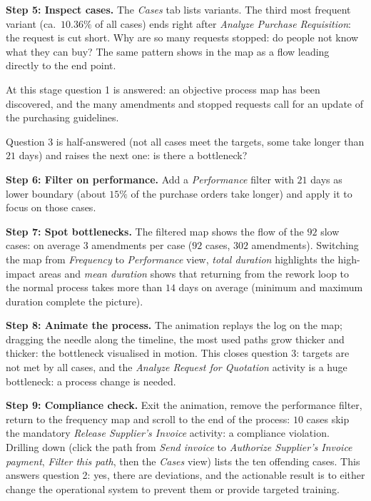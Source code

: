 \textbf{Step 5: Inspect cases.} The \emph{Cases} tab lists variants. The third most frequent variant (ca.\ $10.36\%$ of all cases) ends right after \emph{Analyze Purchase Requisition}: the request is cut short. Why are so many requests stopped: do people not know what they can buy? The same pattern shows in the map as a flow leading directly to the end point.

At this stage question 1 is answered: an objective process map has been discovered, and the many amendments and stopped requests call for an update of the purchasing guidelines.

Question 3 is half-answered (not all cases meet the targets, some take longer than $21$ days) and raises the next one: is there a bottleneck?

\textbf{Step 6: Filter on performance.} Add a \emph{Performance} filter with $21$ days as lower boundary (about $15\%$ of the purchase orders take longer) and apply it to focus on those cases.

\textbf{Step 7: Spot bottlenecks.} The filtered map shows the flow of the $92$ slow cases: on average $3$ amendments per case ($92$ cases, $302$ amendments). Switching the map from \emph{Frequency} to \emph{Performance} view, \emph{total duration} highlights the high-impact areas and \emph{mean duration} shows that returning from the rework loop to the normal process takes more than $14$ days on average (minimum and maximum duration complete the picture).

\textbf{Step 8: Animate the process.} The animation replays the log on the map; dragging the needle along the timeline, the most used paths grow thicker and thicker: the bottleneck visualised in motion. This closes question 3: targets are not met by all cases, and the \emph{Analyze Request for Quotation} activity is a huge bottleneck: a process change is needed.

\textbf{Step 9: Compliance check.} Exit the animation, remove the performance filter, return to the frequency map and scroll to the end of the process: $10$ cases skip the mandatory \emph{Release Supplier's Invoice} activity: a compliance violation. Drilling down (click the path from \emph{Send invoice} to \emph{Authorize Supplier's Invoice payment}, \emph{Filter this path}, then the \emph{Cases} view) lists the ten offending cases. This answers question 2: yes, there are deviations, and the actionable result is to either change the operational system to prevent them or provide targeted training.

